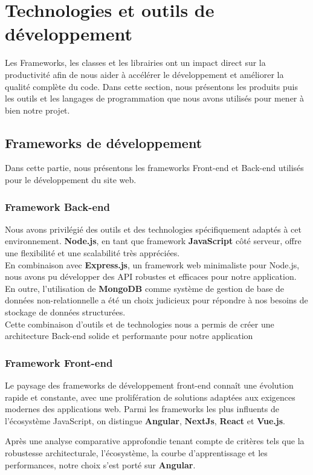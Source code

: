 \section{Technologies et outils de développement } Les Frameworks, les classes et les librairies ont un impact direct sur la productivité
afin de nous aider à accélérer le développement et améliorer la qualité complète du code. Dans
cette section, nous présentons les produits puis les outils et les langages de programmation
que nous avons utilisés pour mener à bien notre projet.
\subsection{Frameworks de développement}
Dans cette partie, nous présentons les frameworks Front-end et Back-end utilisés pour
le développement du site web.
\subsubsection{Framework Back-end}
 Nous avons privilégié des outils et des technologies spécifiquement adaptés à cet environnement. \textbf{Node.js}\cite{b6}, en tant que framework \textbf{JavaScript}\cite{b7} côté serveur, offre une flexibilité et une scalabilité très appréciées.\\ En combinaison avec \textbf{Express.js}\cite{b8}, un framework web minimaliste pour Node.js, nous avons pu développer des API robustes et efficaces pour notre application.\\ En outre, l'utilisation de \textbf{MongoDB}\cite{b9} comme système de gestion de base de données non-relationnelle a été un choix judicieux pour répondre à nos besoins de stockage de données structurées.
 \\ Cette combinaison d'outils et de technologies nous a permis de créer une architecture Back-end solide et performante pour notre application
 \subsubsection{Framework Front-end}
 Le paysage des frameworks de développement front-end connaît une évolution rapide et constante, avec une prolifération de solutions adaptées aux exigences modernes des applications web. Parmi les frameworks les plus influents de l'écosystème JavaScript, on distingue \textbf{Angular}\cite{b10}, \textbf{NextJs}\cite{b11}, \textbf{React}\cite{b12} et \textbf{Vue.js}\cite{b13}.
 
 Après une analyse comparative approfondie tenant compte de critères tels que la robustesse architecturale, l'écosystème, la courbe d'apprentissage et les performances, notre choix s'est porté sur \textbf{Angular}.
 
